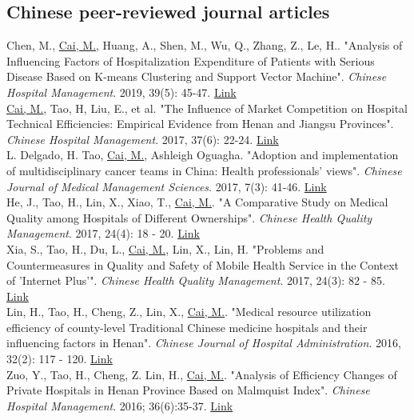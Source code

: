 \documentclass[11pt, a4paper]{article}
\newcommand{\years}[1]{\marginnote{\scriptsize #1}}
\begin{document}
\subsection*{Chinese peer-reviewed journal articles}
\noindent
\years{2019}Chen, M., \underline{Cai, M.}, Huang, A., Shen, M., Wu, Q., Zhang, Z., Le, H.. "Analysis of Influencing Factors of Hospitalization Expenditure of Patients with Serious Disease Based on K-means Clustering and Support Vector Machine". \emph{Chinese Hospital Management}. 2019, 39(5): 45-47. \href{http://d.old.wanfangdata.com.cn/Periodical/zgyygl201905018}{Link}\\
\years{2017}\underline{Cai, 	M.}, Tao, H, Liu, E., et al. "The Influence of Market Competition on Hospital Technical Efficiencies: Empirical Evidence from Henan and Jiangsu Provinces". \emph{Chinese Hospital Management}. 2017, 37(6): 22-24. \href{http://www.cnki.com.cn/Article/CJFDTotal-YYGL201706012.htm}{Link}\\
\years{2017}L. Delgado, H. Tao, \underline{Cai, M.}, Ashleigh Oguagha. "Adoption and implementation of multidisciplinary cancer teams in China: Health professionals’ views". \emph{Chinese Journal of Medical Management Sciences}. 2017, 7(3): 41-46. \href{http://www.cnki.com.cn/Article/CJFDTOTAL-YLGL201703008.htm}{Link}\\
\years{2017}He, J., Tao, H., Lin, X., Xiao, T., \underline{Cai, M.}. "A Comparative Study on Medical Quality among Hospitals of Different Ownerships". \emph{Chinese Health Quality Management}. 2017, 24(4): 18 - 20. \href{http://www.cnki.com.cn/Article/CJFDTOTAL-WSJG201704010.htm}{Link}\\
\years{2017}Xia, S., Tao, H., Du, L., \underline{Cai, M.}, Lin, X., Lin, H. "Problems and Countermeasures in Quality and Safety of Mobile Health Service in the Context of 'Internet Plus'". \emph{Chinese Health Quality Management}. 2017, 24(3): 82 - 85. \href{http://www.cnki.com.cn/Article/CJFDTOTAL-WSJG201703030.htm}{Link}\\
\years{2016}Lin, H., Tao, H., Cheng, Z., Lin, X., \underline{Cai, M.}. "Medical resource utilization efficiency of county-level Traditional Chinese medicine hospitals and their influencing factors in Henan". \emph{Chinese Journal of Hospital Administration}. 2016, 32(2): 117 - 120. \href{http://xuewen.cnki.net/CMFD-1016781136.nh.html}{Link}\\
\years{2016}Zuo, Y., Tao, H., Cheng, Z. Lin, H., \underline{Cai, M.}. "Analysis of Efficiency Changes of Private Hospitals in Henan Province Based on Malmquist Index". \emph{Chinese Hospital Management}. 2016; 36(6):35-37. \href{http://www.cnki.com.cn/Article/CJFDTOTAL-YYGL201606020.htm}{Link}\\
\end{document}
